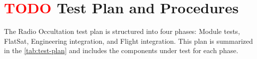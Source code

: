 %
%
%
%
%

%
%
%
%
%
%

\chapter{ \textcolor{red}{TODO} Test Plan and Procedures} \label{ch:test-plan}

The Radio Occultation test plan is structured into four phases: Module tests, FlatSat, Engineering integration, and Flight integration. This plan is summarized in the \autoref{tab:test-plan} and includes the components under test for each phase. 

